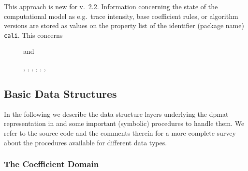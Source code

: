 This approach is new for v.~2.2. Information concerning the state of
the computational model as e.g.\ trace intensity, base coefficient
rules, or algorithm versions are stored as values on the property list
of the identifier (package name) \texttt{cali}. This concerns
\begin{description}
\item[] and 


\item[]


\item[]

\item[]


\item[]


\item[], , , ,
, , 

\end{description}


\subsection{Basic Data Structures}

In the following we describe the data structure layers underlying the
dpmat representation in  and some important (symbolic) procedures
to handle them. We refer to the source code and the comments therein for
a more complete survey about the procedures available for different
data types.

\subsubsection{The Coefficient Domain}

